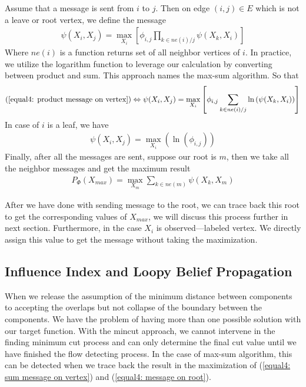 Assume that a message is sent from $i$ to $j$. Then on edge $(i,j) \in E$  which is not a leave or root vertex, we define the message
\begin{align}
\psi(X_i, X_j) = \max_{X_i} \left[ 
\phi_{i,j} \prod_{k \in ne(i)/j} {\psi(X_k, X_i)}
\right]
\label{equal4: product message on vertex}
\end{align}
Where $ne(i)$ is a function returns set of all neighbor vertices of $i$. In practice, we utilize the logarithm function to leverage our calculation by converting between product and sum. This approach names the max-sum algorithm. So that
\begin{align}
(\ref{equal4: product message on vertex}) \Leftrightarrow \psi(X_i, X_j) = \max_{X_i} \left[ 
\phi_{i,j} \sum_{k \in ne(i)/j} {\ln{(\psi(X_k, X_i))}}
\right]
\label{equal4: sum message on vertex}
\end{align}
In case of $i$ is a leaf, we have
\begin{align}
\psi(X_i, X_j) = \max_{X_i}{\left( \ln{(\phi_{i,j})} \right)}
\label{equal4: message on leaf}
\end{align}
Finally, after all the messages are sent, suppose our root is $m$, then we take all the neighbor messages and get the maximum result
\begin{align}
	P_\Phi(X_{max}) = \max_{X_m} {\sum_{k \in ne(m)}{\psi(X_k, X_m)}}
	\label{equal4: message on root}
\end{align}

After we have done with sending message to the root, we can trace back this root to get the corresponding values of $X_{max}$, we will discuss this process further in next section. Furthermore, in the case $X_i$ is observed---labeled vertex. We directly assign this value to get the message without taking the maximization.


\subsection{Influence Index and Loopy Belief Propagation}
\label{subsection: influence and loopy belief}
When we release the assumption of the minimum distance between components to accepting the overlaps but not collapse of the boundary between the components. We have the problem of having more than one possible solution with our target function. With the mincut approach, we cannot intervene in the finding minimum cut process and can only determine the final cut value until we have finished the flow detecting process. In the case of max-sum algorithm, this can be detected when we trace back the result in the maximization of (\ref{equal4: sum message on vertex}) and (\ref{equal4: message on root}). 

